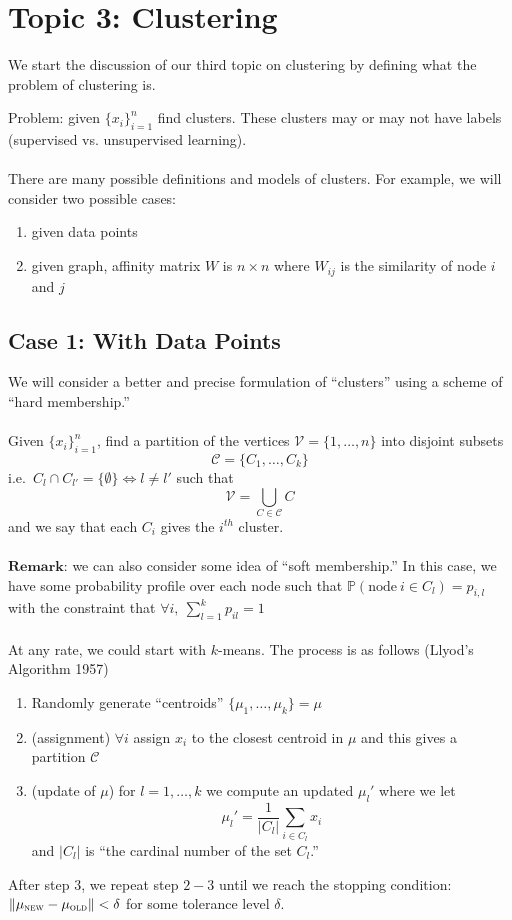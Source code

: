 \documentclass[12pt]{article}
\theoremstyle{plain}
\begin{document}
\section{Topic 3: Clustering}
We start the discussion of our third topic on clustering by defining what the problem of clustering is. 

Problem: given $ \{ x_i \}_{i = 1}^n $ find clusters. These clusters may or may not have labels (supervised vs. unsupervised learning). 
\\ \\
There are many possible definitions and models of clusters.
For example, we will consider two possible cases:
\begin{enumerate}
    \item given data points
    \item given graph, affinity matrix $W $ is $ n \times n $ where $ W_{ij} $ is the similarity of node $ i $ and $ j $
\end{enumerate}

\subsection{Case 1: With Data Points}
We will consider a better and precise formulation of ``clusters'' using a scheme of ``hard membership.''
\\ \\
Given $ \{ x_i \}_{i = 1}^n $, find a partition of the vertices $ \mathcal{V} = \{ 1, \ldots, n \} $
into disjoint subsets
\[
\mathcal{C} = \{ C_1, \ldots, C_k \}
\]
i.e.\ $ C_{l} \cap C_{l'} = \{ \emptyset \} \iff l \neq l' $
such that
\[
\mathcal{V} = \bigcup_{C \in \mathcal{C}} C
\]
and we say that each $ C_{i} $ gives the $ i^{th} $ cluster.
\\ \\
$\textbf{Remark:}$ we can also consider some idea of ``soft membership.''
In this case, we have some probability profile over each node such that
$\mathbb{P} (\text{node}~ i \in C_l) = p_{i,l}$ with the constraint that $ \forall i,~ \sum_{l = 1}^k p_{il} = 1$
\\ \\
At any rate, we could start with $ k $-means.
The process is as follows (Llyod's Algorithm 1957)
\begin{enumerate}
    \item Randomly generate ``centroids'' $ \{ \mu_1, \ldots, \mu_k \} = \mu $
    \item (assignment) $ \forall i $ assign $ x_i $ to the closest centroid in $ \mu $ and this gives a partition $ \mathcal{C} $
    \item (update of $ \mu $) for $ l = 1, \ldots, k $ we compute an updated $ \mu_l' $ where we let
    \[
    \mu_l' = \frac{1}{| C_{l} |} \sum_{i \in C_l} x_i
    \]
    and $ | C_{l} | $ is ``the cardinal number of the set $ C_l $.''
\end{enumerate}
After step $ 3 $, we repeat step $ 2-3 $ until we reach the stopping condition: $\| \mu_{\textsc{new}} - \mu_{\textsc{old}} \| < \delta$ for some tolerance level $ \delta $.
\end{document}
